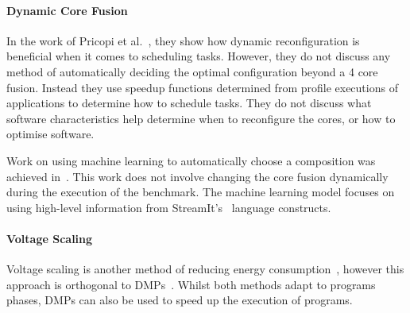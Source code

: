 \vspace{-0.5em}
\paragraph{Dynamic Core Fusion}
In the work of Pricopi et al.~\cite{pricopiSchedCoreComp2014}, they show how dynamic reconfiguration is beneficial when it comes to scheduling tasks.
However, they do not discuss any method of automatically deciding the optimal configuration beyond a 4 core fusion.
Instead they use speedup functions determined from profile executions of applications to determine how to schedule tasks.
They do not discuss what software characteristics help determine when to reconfigure the cores, or how to optimise software.

Work on using machine learning to automatically choose a composition was achieved in~\cite{micolet2016dmpstream}.
This work does not involve changing the core fusion dynamically during the execution of the benchmark.
The machine learning model focuses on using high-level information from StreamIt's~\cite{thiesStreamit2010} language constructs.

\vspace{-0.5em}
\paragraph{Voltage Scaling}
Voltage scaling is another method of reducing energy consumption~\cite{paganiEECHM2017}, however this approach is orthogonal to DMPs~\cite{sibi}.
Whilst both methods adapt to programs phases, DMPs can also be used to speed up the execution of programs.
